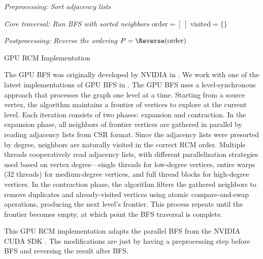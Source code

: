 \begin{algorithm}[H]

    \BlankLine

    \emph{Preprocessing: Sort adjacency lists}\;
    \BlankLine

    \emph{Core traversal: Run BFS with sorted neighbors}\;
    $\text{order} = [\,]$\;
    $\text{visited} = \{\}$\;
    \BlankLine

    \BlankLine

    \emph{Postprocessing: Reverse the ordering}\;
    $P = \Reverse(\text{order})$\;

    \;

    \caption{GPU RCM Implementation}
    \label{alg:gpu_rcm}
\end{algorithm}

The GPU BFS was originally developed by NVIDIA in \cite{merrill_scalable_nodate}. We work with one of the latest implementations of GPU BFS in \cite{kaleta_kaletapbfs-cuda-gpu_2025}. The GPU BFS uses a level-synchronous approach that processes the graph one level at a time. Starting from a source vertex, the algorithm maintains a frontier of vertices to explore at the current level. Each iteration consists of two phases: expansion and contraction. In the expansion phase, all neighbors of frontier vertices are gathered in parallel by reading adjacency lists from CSR format. Since the adjacency lists were presorted by degree, neighbors are naturally visited in the correct RCM order. Multiple threads cooperatively read adjacency lists, with different parallelization strategies used based on vertex degree—single threads for low-degree vertices, entire warps (32 threads) for medium-degree vertices, and full thread blocks for high-degree vertices. In the contraction phase, the algorithm filters the gathered neighbors to remove duplicates and already-visited vertices using atomic compare-and-swap operations, producing the next level's frontier. This process repeats until the frontier becomes empty, at which point the BFS traversal is complete.

This GPU RCM implementation adapts the parallel BFS from the NVIDIA CUDA SDK \cite{kaleta_kaletapbfs-cuda-gpu_2025}. The modifications are just by having a preprocessing step before BFS and reversing the result after BFS.
